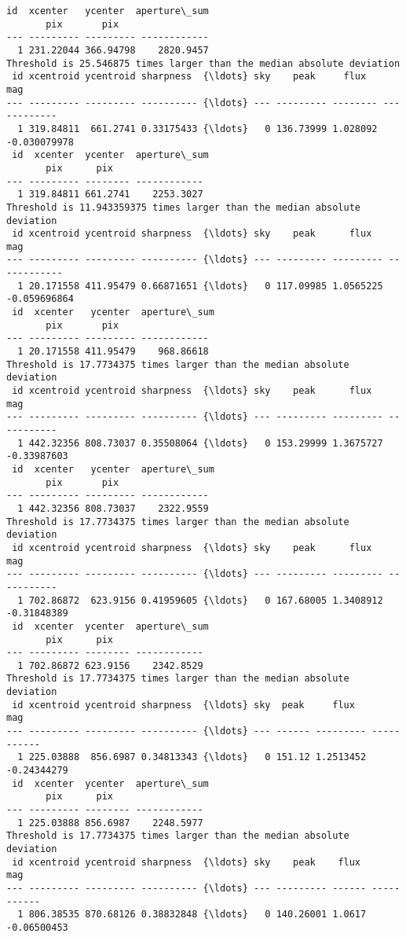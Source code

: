 \documentclass[11pt]{article}
\begin{document}
\begin{Verbatim}[commandchars=\\\{\}]
 id  xcenter   ycenter  aperture\_sum
       pix       pix
--- --------- --------- ------------
  1 231.22044 366.94798    2820.9457
Threshold is 25.546875 times larger than the median absolute deviation
 id xcentroid ycentroid sharpness  {\ldots} sky    peak     flux       mag
--- --------- --------- ---------- {\ldots} --- --------- -------- ------------
  1 319.84811  661.2741 0.33175433 {\ldots}   0 136.73999 1.028092 -0.030079978
 id  xcenter  ycenter  aperture\_sum
       pix      pix
--- --------- -------- ------------
  1 319.84811 661.2741    2253.3027
Threshold is 11.943359375 times larger than the median absolute deviation
 id xcentroid ycentroid sharpness  {\ldots} sky    peak      flux       mag
--- --------- --------- ---------- {\ldots} --- --------- --------- ------------
  1 20.171558 411.95479 0.66871651 {\ldots}   0 117.09985 1.0565225 -0.059696864
 id  xcenter   ycenter  aperture\_sum
       pix       pix
--- --------- --------- ------------
  1 20.171558 411.95479    968.86618
Threshold is 17.7734375 times larger than the median absolute deviation
 id xcentroid ycentroid sharpness  {\ldots} sky    peak      flux       mag
--- --------- --------- ---------- {\ldots} --- --------- --------- -----------
  1 442.32356 808.73037 0.35508064 {\ldots}   0 153.29999 1.3675727 -0.33987603
 id  xcenter   ycenter  aperture\_sum
       pix       pix
--- --------- --------- ------------
  1 442.32356 808.73037    2322.9559
Threshold is 17.7734375 times larger than the median absolute deviation
 id xcentroid ycentroid sharpness  {\ldots} sky    peak      flux       mag
--- --------- --------- ---------- {\ldots} --- --------- --------- -----------
  1 702.86872  623.9156 0.41959605 {\ldots}   0 167.68005 1.3408912 -0.31848389
 id  xcenter  ycenter  aperture\_sum
       pix      pix
--- --------- -------- ------------
  1 702.86872 623.9156    2342.8529
Threshold is 17.7734375 times larger than the median absolute deviation
 id xcentroid ycentroid sharpness  {\ldots} sky  peak     flux       mag
--- --------- --------- ---------- {\ldots} --- ------ --------- -----------
  1 225.03888  856.6987 0.34813343 {\ldots}   0 151.12 1.2513452 -0.24344279
 id  xcenter  ycenter  aperture\_sum
       pix      pix
--- --------- -------- ------------
  1 225.03888 856.6987    2248.5977
Threshold is 17.7734375 times larger than the median absolute deviation
 id xcentroid ycentroid sharpness  {\ldots} sky    peak    flux      mag
--- --------- --------- ---------- {\ldots} --- --------- ------ -----------
  1 806.38535 870.68126 0.38832848 {\ldots}   0 140.26001 1.0617 -0.06500453

\end{Verbatim}
\end{document}
